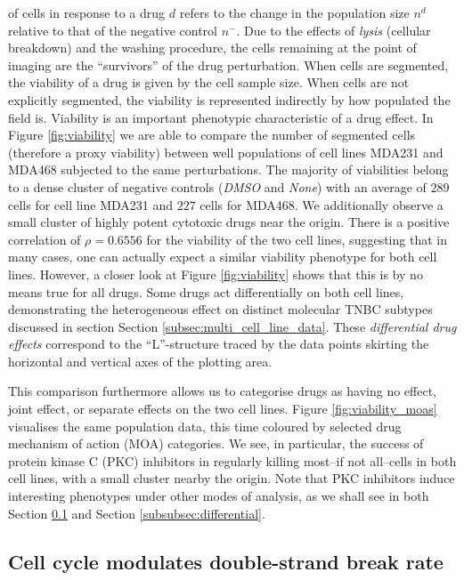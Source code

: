 of cells in response to a drug $d$ refers to the change in the population size $n^d$ relative to that of the negative control $n^-$. Due to the effects of \emph{lysis} (cellular breakdown) and the washing procedure, the cells remaining at the point of imaging are the ``survivors'' of the drug perturbation. When cells are segmented, the viability of a drug is given by the cell sample size. When cells are not explicitly segmented, the viability is represented indirectly by how populated the field is. Viability is an important phenotypic characteristic of a drug effect. In Figure \ref{fig:viability} we are able to compare the number of segmented cells (therefore a proxy viability) between well populations of cell lines MDA231 and MDA468 subjected to the same perturbations. The majority of viabilities belong to a dense cluster of negative controls (\emph{DMSO} and \emph{None}) with an average of $289$ cells for cell line MDA231 and $227$ cells for MDA468. We additionally observe a small cluster of highly potent cytotoxic drugs near the origin. There is a positive correlation of $\rho = 0.6556$ for the viability of the two cell lines, suggesting that in many cases, one can actually expect a similar viability phenotype for both cell lines. However, a closer look at Figure \ref{fig:viability} shows that this is by no means true for all drugs. Some drugs act differentially on both cell lines, demonstrating the heterogeneous effect on distinct molecular TNBC subtypes discussed in section Section \ref{subsec:multi_cell_line_data}. These \emph{differential drug effects} correspond to the ``L''-structure traced by the data points skirting the horizontal and vertical axes of the plotting area.

This comparison furthermore allows us to categorise drugs as having no effect, joint effect, or separate effects on the two cell lines. Figure \ref{fig:viability_moas} visualises the same population data, this time coloured by selected drug mechanism of action (MOA) categories. We see, in particular, the success of protein kinase C (PKC) inhibitors in regularly killing most--if not all--cells in both cell lines, with a small cluster nearby the origin. Note that PKC inhibitors induce interesting phenotypes under other modes of analysis, as we shall see in both Section \ref{subsec:multivariate} and Section \ref{subsubsec:differential}.

\subsection{Cell cycle modulates double-strand break rate}
\label{subsec:multivariate}

